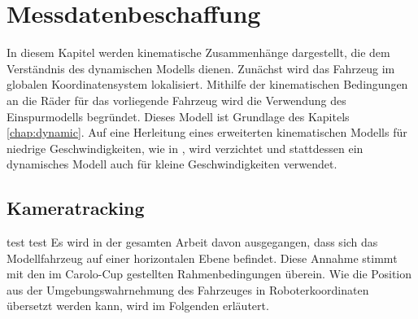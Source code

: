 \chapter{Messdatenbeschaffung} \label{chap:messdaten}
In diesem Kapitel werden kinematische Zusammenhänge dargestellt, die dem Verständnis des dynamischen Modells dienen. Zunächst wird das Fahrzeug im globalen Koordinatensystem lokalisiert. Mithilfe der kinematischen Bedingungen an die Räder für das vorliegende Fahrzeug wird die Verwendung des Einspurmodells begründet. Dieses Modell ist Grundlage des Kapitels \ref{chap:dynamic}. Auf eine Herleitung eines erweiterten kinematischen Modells für niedrige Geschwindigkeiten, wie in \cite{Werling2010}, wird verzichtet und stattdessen ein dynamisches Modell auch für kleine Geschwindigkeiten verwendet.

\section{Kameratracking} \label{sec:tracking}
test test
Es wird in der gesamten Arbeit davon ausgegangen, dass sich das Modellfahrzeug auf einer horizontalen Ebene befindet.
Diese Annahme stimmt mit den im Carolo-Cup gestellten Rahmenbedingungen überein. 
Wie die Position aus der Umgebungswahrnehmung des Fahrzeuges in Roboterkoordinaten übersetzt werden kann, wird im Folgenden erläutert.